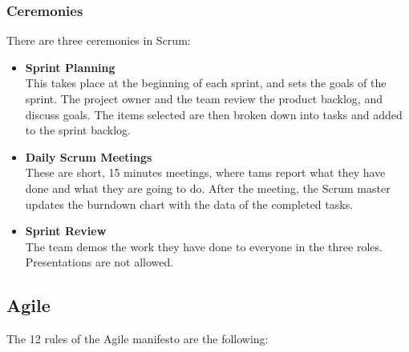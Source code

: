 \documentclass{article}
\begin{document}
\subsubsection{Ceremonies}
There are three ceremonies in Scrum:

\begin{itemize}
	\item \textbf{Sprint Planning}
	\vspace{.2cm} \\
	This takes place at the beginning of each sprint, and sets the goals of the sprint. The project owner and the team review the product backlog, and discuss goals. The items selected are then broken down into tasks and added to the sprint backlog.
	
	\item \textbf{Daily Scrum Meetings}
	\vspace{.2cm} \\
	These are short, 15 minutes meetings, where tams report what they have done and what they are going to do. After the meeting, the Scrum master updates the burndown chart with the data of the completed tasks.
	
	\item \textbf{Sprint Review}
	\vspace{.2cm} \\
	The team demos the work they have done to everyone in the three roles. Presentations are not allowed.
\end{itemize}

\subsection{Agile}
The 12 rules of the Agile manifesto are the following:
\end{document}
